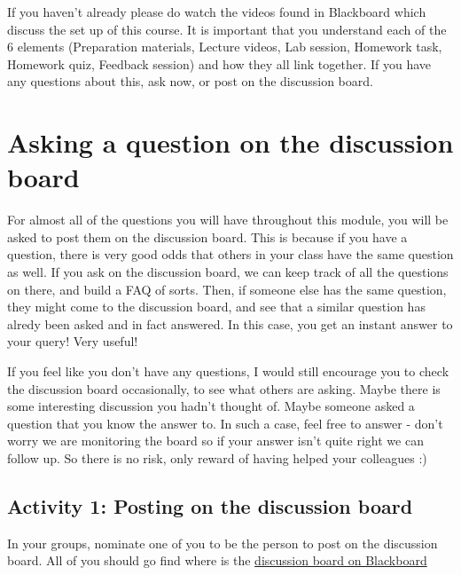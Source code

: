 \documentclass[
]{book}
\begin{document}
If you haven't already please do watch the videos found in Blackboard which discuss the set up of this course. It is important that you understand each of the 6 elements (Preparation materials, Lecture videos, Lab session, Homework task, Homework quiz, Feedback session) and how they all link together. If you have any questions about this, ask now, or post on the discussion board.

\hypertarget{asking-a-question-on-the-discussion-board}{%
\section{Asking a question on the discussion board}\label{asking-a-question-on-the-discussion-board}}

For almost all of the questions you will have throughout this module, you will be asked to post them on the discussion board. This is because if you have a question, there is very good odds that others in your class have the same question as well. If you ask on the discussion board, we can keep track of all the questions on there, and build a FAQ of sorts. Then, if someone else has the same question, they might come to the discussion board, and see that a similar question has alredy been asked and in fact answered. In this case, you get an instant answer to your query! Very useful!

If you feel like you don't have any questions, I would still encourage you to check the discussion board occasionally, to see what others are asking. Maybe there is some interesting discussion you hadn't thought of. Maybe someone asked a question that you know the answer to. In such a case, feel free to answer - don't worry we are monitoring the board so if your answer isn't quite right we can follow up. So there is no risk, only reward of having helped your colleagues :)

\hypertarget{activity-1-posting-on-the-discussion-board}{%
\subsection{Activity 1: Posting on the discussion board}\label{activity-1-posting-on-the-discussion-board}}

In your groups, nominate one of you to be the person to post on the discussion board. All of you should go find where is the \href{https://online.manchester.ac.uk/webapps/discussionboard/do/conference?toggle_mode=edit\&action=list_forums\&course_id=_62746_1\&nav=discussion_board_entry\&mode=cpview}{discussion board on Blackboard}
\end{document}
